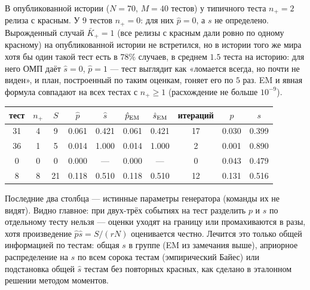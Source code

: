 \documentclass[11pt,a4paper]{article}
\theoremstyle{plain}
\theoremstyle{definition}
\begin{document}
В опубликованной истории ($N=70$, $M=40$ тестов) у типичного теста $n_+=2$ релиза с красным. У $9$ тестов $n_+=0$: для них $\hat p=0$, а $s$ не определено. Вырожденный случай $\bar K_+=1$ (все релизы с красным дали ровно по одному красному) на опубликованной истории не встретился, но в истории того же мира хотя бы один такой тест есть в $78\%$ случаев, в среднем $1.5$ теста на историю: для него ОМП даёт $\hat s=0$, $\hat p=1$ --- тест выглядит как «ломается всегда, но почти не виден», и план, построенный по таким оценкам, гоняет его по $5$ раз. EM и явная формула совпадают на всех тестах с $n_+\ge1$ (расхождение не больше $10^{-9}$).

\begin{center}\small
\begin{tabular}{@{}cccccccccc@{}}
\toprule
тест & $n_+$ & $S$ & $\hat p$ & $\hat s$ & $\hat p_{\rm EM}$ & $\hat s_{\rm EM}$ & итераций & $p$ & $s$ \\
\midrule
31 & 4 & 9 & 0.061 & 0.421 & 0.061 & 0.421 & 17 & 0.030 & 0.399 \\
36 & 1 & 5 & 0.014 & 1.000 & 0.014 & 1.000 & 2 & 0.001 & 0.890 \\
0 & 0 & 0 & 0.000 & --- & 0.000 & --- & 0 & 0.043 & 0.479 \\
8 & 8 & 21 & 0.118 & 0.510 & 0.118 & 0.510 & 12 & 0.131 & 0.516 \\
\bottomrule
\end{tabular}
\end{center}

Последние два столбца --- истинные параметры генератора (команды их не видят). Видно главное: при двух-трёх событиях на тест разделить $p$ и $s$ по отдельному тесту нельзя --- оценки уходят на границу или промахиваются в разы, хотя произведение $\hat p\hat s=S/(rN)$ оценивается честно. Лечится это только общей информацией по тестам: общая $s$ в группе (EM из замечания выше), априорное распределение на $s$ по всем сорока тестам (эмпирический Байес) или подстановка общей $\hat s$ тестам без повторных красных, как сделано в эталонном решении методом моментов.
\end{document}
